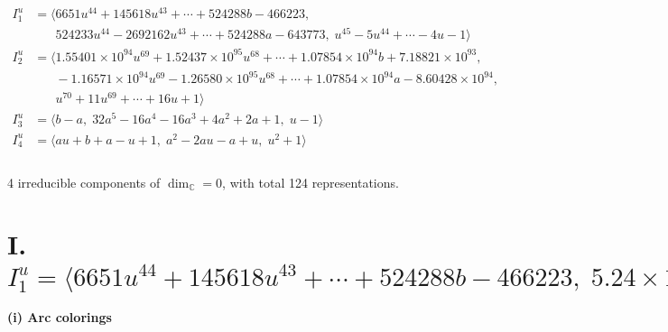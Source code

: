 \documentclass[1p]{elsarticle_modified}
\theoremstyle{definition}
\begin{document}
\begin{align*}
I^u_{1}&=\langle 
6651 u^{44}+145618 u^{43}+\cdots+524288 b-466223,\\
\phantom{I^u_{1}}&\phantom{= \langle  }524233 u^{44}-2692162 u^{43}+\cdots+524288 a-643773,\;u^{45}-5 u^{44}+\cdots-4 u-1\rangle \\
I^u_{2}&=\langle 
1.55401\times10^{94} u^{69}+1.52437\times10^{95} u^{68}+\cdots+1.07854\times10^{94} b+7.18821\times10^{93},\\
\phantom{I^u_{2}}&\phantom{= \langle  }-1.16571\times10^{94} u^{69}-1.26580\times10^{95} u^{68}+\cdots+1.07854\times10^{94} a-8.60428\times10^{94},\\
\phantom{I^u_{2}}&\phantom{= \langle  }u^{70}+11 u^{69}+\cdots+16 u+1\rangle \\
I^u_{3}&=\langle 
b- a,\;32 a^5-16 a^4-16 a^3+4 a^2+2 a+1,\;u-1\rangle \\
I^u_{4}&=\langle 
a u+b+a- u+1,\;a^2-2 a u- a+u,\;u^2+1\rangle \\
\\
\end{align*}
\raggedright * 4 irreducible components of $\dim_{\mathbb{C}}=0$, with total 124 representations.\\
\newpage
\renewcommand{\arraystretch}{1}
\centering \section*{I. $I^u_{1}= \langle 6651 u^{44}+145618 u^{43}+\cdots+524288 b-466223,\;5.24\times10^{5} u^{44}-2.69\times10^{6} u^{43}+\cdots+5.24\times10^{5} a-6.44\times10^{5},\;u^{45}-5 u^{44}+\cdots-4 u-1 \rangle$}
\flushleft \textbf{(i) Arc colorings}\\
\end{document}
